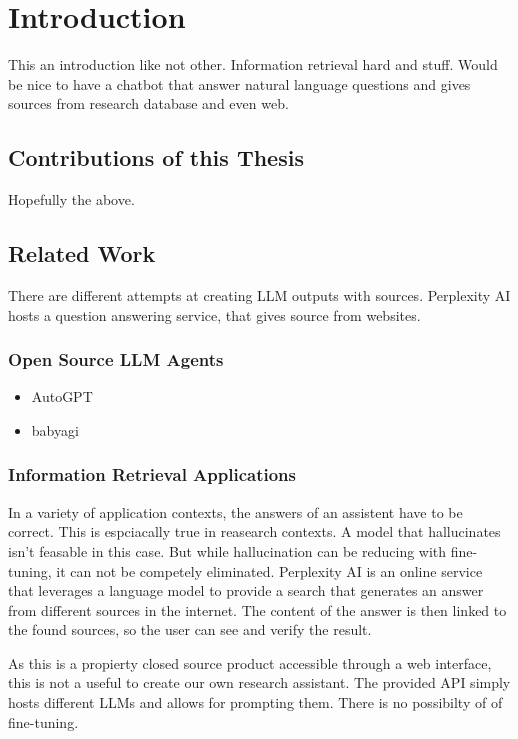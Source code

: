 \documentclass[english, version-2022-01]{uzl-thesis}
\begin{document}
\chapter{Introduction}

This an introduction like not other. Information retrieval hard and stuff. Would be nice to have a chatbot that answer natural language questions and gives sources from research database and even web.

\section{Contributions of this Thesis}

Hopefully the above.

\section{Related Work}

There are different attempts at creating LLM outputs with sources. Perplexity AI hosts a question answering service, that gives source from websites.

\subsection{Open Source LLM Agents}
\begin{itemize}
	\item AutoGPT
	\item babyagi
\end{itemize}
\subsection{Information Retrieval Applications}

In a variety of application contexts, the answers of an assistent have to be correct. This is espciacally true in reasearch contexts. A model that hallucinates isn't feasable in this case. But while hallucination can be reducing with fine-tuning, it can not be competely eliminated. Perplexity AI is an online service that leverages a language model to provide a search that generates an answer from different sources in the internet. The content of the answer is then linked to the found sources, so the user can see and verify the result.

As this is a propierty closed source product accessible through a web interface, this is not a useful to create our own research assistant. The provided API simply hosts different LLMs and allows for prompting them. There is no possibilty of of fine-tuning.
\end{document}

